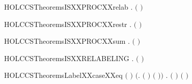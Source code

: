 \newcommand{\HOLCCSTheoremsISXXPROCXXprefix}{\UseVerbatim{HOLCCSTheoremsISXXPROCXXprefix}}
\begin{SaveVerbatim}{HOLCCSTheoremsISXXPROCXXrelab}
\HOLTokenTurnstile{} \HOLSymConst{\HOLTokenForall{}} .  \ensuremath{(}  \ensuremath{)} \HOLSymConst{\HOLTokenEquiv{}}  
\end{SaveVerbatim}
\newcommand{\HOLCCSTheoremsISXXPROCXXrelab}{\UseVerbatim{HOLCCSTheoremsISXXPROCXXrelab}}
\begin{SaveVerbatim}{HOLCCSTheoremsISXXPROCXXrestr}
\HOLTokenTurnstile{} \HOLSymConst{\HOLTokenForall{}} .  \ensuremath{(}  \ensuremath{)} \HOLSymConst{\HOLTokenEquiv{}}  
\end{SaveVerbatim}
\newcommand{\HOLCCSTheoremsISXXPROCXXrestr}{\UseVerbatim{HOLCCSTheoremsISXXPROCXXrestr}}
\begin{SaveVerbatim}{HOLCCSTheoremsISXXPROCXXsum}
\HOLTokenTurnstile{} \HOLSymConst{\HOLTokenForall{}} .  \ensuremath{(} \HOLSymConst{\ensuremath{+}} \ensuremath{)} \HOLSymConst{\HOLTokenEquiv{}}   \HOLSymConst{\HOLTokenConj{}}  
\end{SaveVerbatim}
\newcommand{\HOLCCSTheoremsISXXPROCXXsum}{\UseVerbatim{HOLCCSTheoremsISXXPROCXXsum}}
\begin{SaveVerbatim}{HOLCCSTheoremsISXXRELABELING}
\HOLTokenTurnstile{} \HOLSymConst{\HOLTokenForall{}}.  \ensuremath{(} \ensuremath{)}
\end{SaveVerbatim}
\newcommand{\HOLCCSTheoremsISXXRELABELING}{\UseVerbatim{HOLCCSTheoremsISXXRELABELING}}
\begin{SaveVerbatim}{HOLCCSTheoremsLabelXXcaseXXeq}
\HOLTokenTurnstile{} \ensuremath{(}    \HOLSymConst{\ensuremath{=}} \ensuremath{)} \HOLSymConst{\HOLTokenEquiv{}}
   \ensuremath{(}\HOLSymConst{\HOLTokenExists{}}. \ensuremath{(} \HOLSymConst{\ensuremath{=}}  \ensuremath{)} \HOLSymConst{\HOLTokenConj{}} \ensuremath{(}  \HOLSymConst{\ensuremath{=}} \ensuremath{)}\ensuremath{)} \HOLSymConst{\HOLTokenDisj{}}
   \HOLSymConst{\HOLTokenExists{}}. \ensuremath{(} \HOLSymConst{\ensuremath{=}}  \ensuremath{)} \HOLSymConst{\HOLTokenConj{}} \ensuremath{(}  \HOLSymConst{\ensuremath{=}} \ensuremath{)}
\end{SaveVerbatim}
